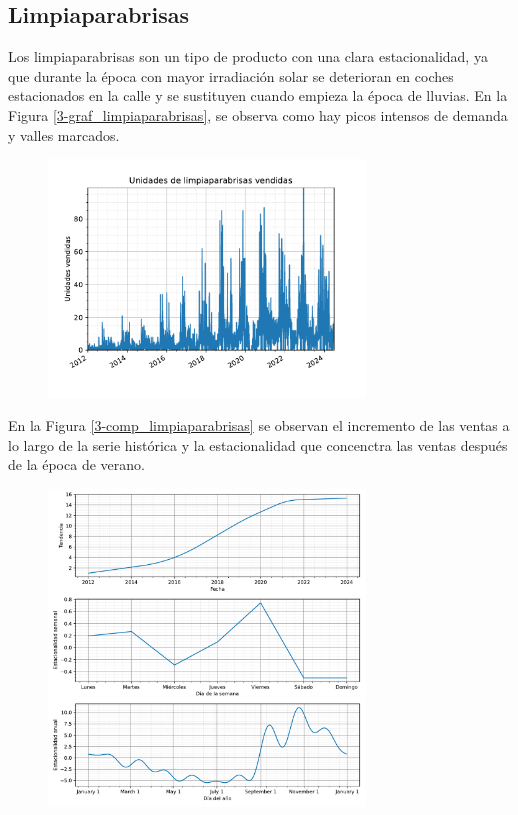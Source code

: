 \subsection{Limpiaparabrisas}

Los limpiaparabrisas son un tipo de producto con una clara estacionalidad, ya que durante la época con mayor irradiación solar se deterioran en coches estacionados en la calle y se sustituyen cuando empieza la época de lluvias. En la Figura \ref*{3-graf_limpiaparabrisas}, se observa como hay picos intensos de demanda y valles marcados.

\begin{figure}[H]
	{\includegraphics[width=0.75\textwidth]{imagenes/grafica_limpiaparabrisas.pdf}}
\end{figure}

En la Figura \ref*{3-comp_limpiaparabrisas} se observan el incremento de las ventas a lo largo de la serie histórica y la estacionalidad que concenctra las ventas después de la época de verano.

\begin{figure}[H]
	{\includegraphics[width=0.75\textwidth]{imagenes/comps_limpiaparabrisas.pdf}}
\end{figure}


